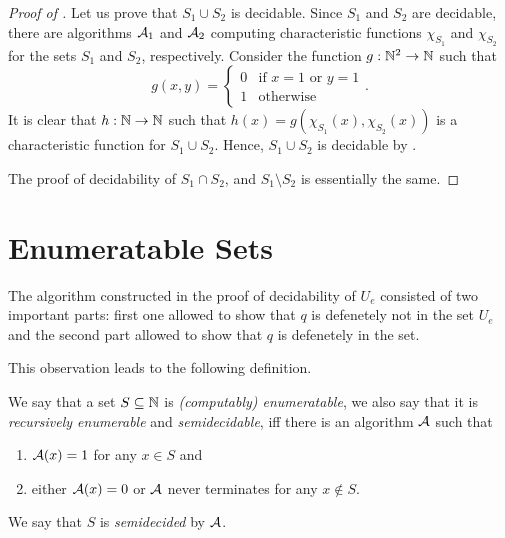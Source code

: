 \begin{proof}[Proof of ]
  Let us prove that $S_1 \cup S_2$ is decidable. Since $S_1$ and $S_2$ are
  decidable, there are algorithms $\mathcal{A}_1$ and $\mathcal{A}_2$
  computing characteristic functions $\chi_{S_1}$ and $\chi_{S_2}$
  for the sets $S_1$ and $S_2$, respectively.
  Consider the function $g : \mathbb{N}^2 \to \mathbb{N}$ such that
  \[
    g(x, y) = \begin{cases}
      0 & \text{if } x = 1 \text{ or } y = 1 \\
      1 & \text{otherwise}
    \end{cases}.
  \]
  It is clear that $h : \mathbb{N} \to \mathbb{N}$ such that
  $h(x) = g(\chi_{S_1}(x), \chi_{S_2}(x))$ is a characteristic function for
  $S_1 \cup S_2$. Hence, $S_1 \cup S_2$ is decidable by
  .

  The proof of decidability of $S_1 \cap S_2$, and $S_1 \setminus S_2$
  is essentially the same.
\end{proof}

\section{Enumeratable Sets}
The algorithm constructed in the proof of decidability of $U_e$ consisted of
two important parts: first one allowed to show that $q$ is defenetely not in the
set $U_e$ and the second part allowed to show that $q$ is defenetely in the set.

This observation leads to the following definition.
\begin{definition}
  We say that a set $S \subseteq \mathbb{N}$ is \emph{(computably) enumeratable},
  we also say that it is \emph{recursively enumerable} and \emph{semidecidable},
  iff there is an algorithm $\mathcal{A}$ such that
  \begin{enumerate}
    \item $\mathcal{A}(x) = 1$ for any $x \in S$ and
    \item either $\mathcal{A}(x) = 0$ or $\mathcal{A}$ never terminates for
      any $x \notin S$.
  \end{enumerate}

  We say that $S$ is \emph{semidecided} by $\mathcal{A}$.
\end{definition}

